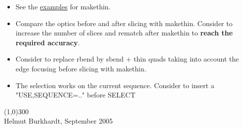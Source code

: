 \begin{itemize}
	\item See the \href{http://cern.ch/frs/mad-X_examples/makethin/}{examples} for makethin. 
	\item Compare the optics before and after slicing with makethin. Consider to increase the number of slices and rematch after makethin to \textbf{reach the required accuracy}. 
	\item Consider to replace rbend by sbend + thin quads taking into account the edge focusing before slicing with makethin. 
	\item The selection works on the current sequence. Consider to insert a "USE,SEQUENCE=.." before SELECT 
\end{itemize}


\line(1,0){300}
\\
 Helmut Burkhardt, September 2005 

